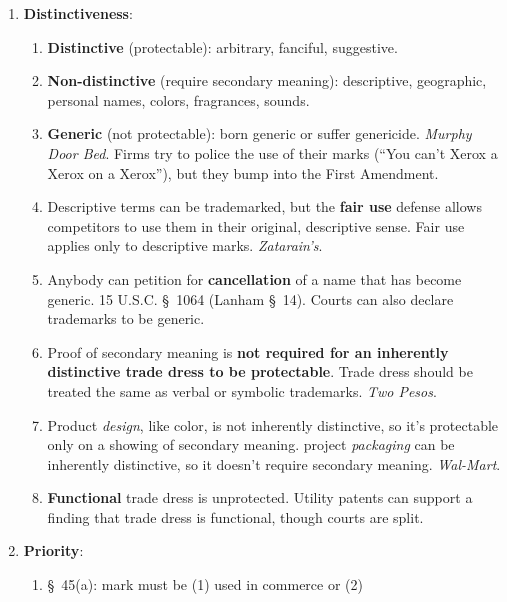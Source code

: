 \begin{enumerate}
    \begin{enumerate}
        \item \textbf{Distinctiveness}:
        \begin{enumerate}
            \item \textbf{Distinctive} (protectable): arbitrary, fanciful, 
            suggestive.
            \item \textbf{Non-distinctive} (require secondary meaning): 
            descriptive, geographic, personal names, colors, fragrances, 
            sounds.
            \item \textbf{Generic} (not protectable): born generic or suffer 
            genericide. \emph{Murphy Door Bed}. Firms try to police the use of 
            their marks (``You can't Xerox a Xerox on a Xerox''), but they 
            bump into the First Amendment.
            \item Descriptive terms can be trademarked, but the \textbf{fair 
            use} defense allows competitors to use them in their original, 
            descriptive sense. Fair use applies only to descriptive marks.  
            \emph{Zatarain's}.
            \item Anybody can petition for \textbf{cancellation} of a name 
            that has become generic. 15 U.S.C. \S\ 1064 (Lanham \S\ 14).  
            Courts can also declare trademarks to be generic.
            \item Proof of secondary meaning is \textbf{not required for an 
            inherently distinctive trade dress to be protectable}. Trade dress 
            should be treated the same as verbal or symbolic trademarks.  
            \emph{Two Pesos}.
            \item Product \emph{design}, like color, is not inherently 
            distinctive, so it's protectable only on a showing of secondary 
            meaning. project \emph{packaging} can be inherently distinctive, 
            so it doesn't require secondary meaning. \emph{Wal-Mart}.
            \item \textbf{Functional} trade dress is unprotected. Utility 
            patents can support a finding that trade dress is functional, 
            though courts are split.
        \end{enumerate}
        \item \textbf{Priority}:
        \begin{enumerate}
            \item \S\ 45(a): mark must be (1) used in commerce or (2) 

\end{enumerate}
\end{enumerate}
\end{enumerate}
